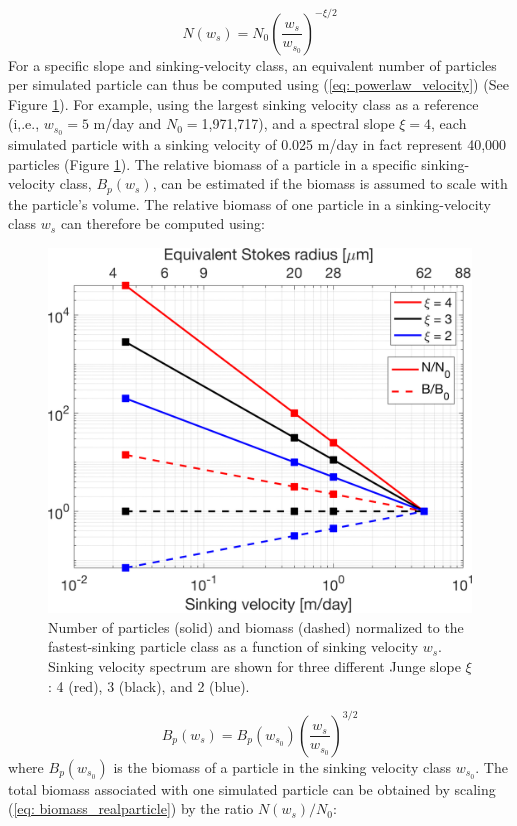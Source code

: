 \documentclass[draft,linenumbers]{agujournal2018}
\begin{document}
\begin{equation}
N(w_s) = N_0 \left(\frac{w_s}{w_{s_0}}\right)^{-\xi/2}
\label{eq: powerlaw_velocity}
\end{equation}
For a specific slope and sinking-velocity class, an equivalent number of particles per simulated particle can thus be computed using (\ref{eq: powerlaw_velocity}) (See Figure \ref{fig: sinking_velocity_spectrum}). For example, using the largest sinking velocity class as a reference (i,.e., $w_{s_0} = 5$ m/day and $N_0=$1,971,717), and a spectral slope $\xi = 4$, each simulated particle with a sinking velocity of 0.025 m/day in fact represent 40,000 particles (Figure \ref{fig: sinking_velocity_spectrum}). The relative biomass of a particle in a specific sinking-velocity class, $B_p(w_s)$, can be estimated if the biomass is assumed to scale with the particle's volume. The relative biomass of one particle in a sinking-velocity class $w_s$ can therefore be computed using:

\begin{figure}[ht]
	\centering
	\includegraphics[width = .6\linewidth]{figures/Fig4_particle_PDF}
	\caption{Number of particles (solid) and biomass (dashed) normalized to the fastest-sinking particle class as a function of sinking velocity $w_s$. Sinking velocity spectrum are shown for three different Junge slope $\xi$: 4 (red), 3 (black), and 2 (blue).}
	\label{fig: sinking_velocity_spectrum}
\end{figure}

\begin{equation}
	B_p(w_s) = B_p(w_{s_0})\left(\frac{w_s}{w_{s_0}}\right)^{3/2}
	\label{eq: biomass_realparticle}
\end{equation}
where $B_p(w_{s_0})$ is the biomass of a particle in the sinking velocity class $w_{s_0}$. The total biomass associated with one simulated particle can be obtained by scaling (\ref{eq: biomass_realparticle}) by the ratio $N(w_s)/N_0$:
\end{document}
